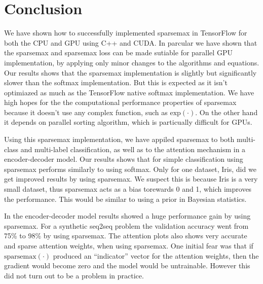 \section{Conclusion}

We have shown how to successfully implemented sparsemax in TensorFlow for both the CPU and GPU using C++ and CUDA. In parcular we have shown that the sparsemax and sparsemax loss can be made sutiable for parallel GPU implementation, by applying only minor changes to the algorithms and equations. Our results shows that the sparsemax implementation is slightly but significantly slower than the softmax implementation. But this is expected as it isn't optimiazed as much as the TensorFlow native softmax implementation. We have high hopes for the the computational performance properties of sparsemax because it doesn't use any complex function, such as $\mathrm{exp}(\cdot)$. On the other hand it depends on parallel sorting algorithm, which is particually difficult for GPUs.

Using this sparsemax implementation, we have appiled sparsemax to both multi-class and multi-label classification, as well as to the attention mechanism in a encoder-decoder model. Our results shows that for simple classification using sparsemax performs similarly to using softmax. Only for one dataset, Iris, did we get improved results by using sparsemax. We suspect this is because Iris is a very small dataset, thus sparsemax acts as a bias torewards 0 and 1, which improves the performance. This would be similar to using a prior in Bayesian statistics.

In the encoder-decoder model results showed a huge performance gain by using sparsemax. For a synthetic seq2seq problem the validation accuracy went from 75\% to 98\% by using sparsemax. The attention plots also shows very accurate and sparse attention weights, when using sparsemax. One initial fear was that if $\mathrm{sparsemax}(\cdot)$ produced an ``indicator'' vector for the attention weights, then the gradient would become zero and the model would be untrainable. However this did not turn out to be a problem in practice.